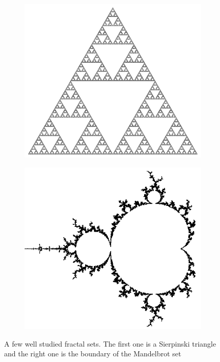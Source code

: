 \begin{figure}
\begin{subfigure}{.5\textwidth}
  \centering
  \includegraphics[width=.8\linewidth]{pics/intro/sierpinski.png}
  \label{fig:sfig1}
\end{subfigure}%
\begin{subfigure}{.5\textwidth}
  \centering
  \includegraphics[width=.8\linewidth]{pics/intro/Boundary_mandelbrot_set.png}
  \label{fig:sfig2}
\end{subfigure}
\caption{A few well studied fractal sets. The first one is a Sierpinski triangle and the right one is the boundary of the Mandelbrot set}
\label{fig:examples1}
\end{figure}




